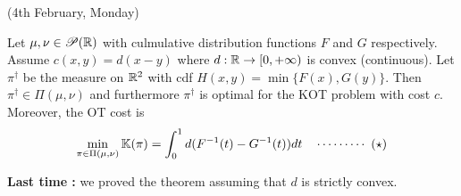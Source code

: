 \documentclass[12pt,a4paper]{article}
\begin{document}
\newday

(4th February, Monday)
\s

\thm Let $\mu, \nu \in \mathscr{P}(\mathbb{R})$ with culmulative distribution functions $F$ and $G$ respectively. Assume $c(x,y) = d(x-y)$ where $d: \mathbb{R} \rightarrow [0, +\infty)$ is convex (continuous). Let $\pi^{\dagger}$ be the measure on $\mathbb{R}^2$ with cdf $H(x,y) = \min \{ F(x), G(y) \}$. Then $\pi^{\dagger} \in \Pi(\mu, \nu)$ and furthermore $\pi^{\dagger}$ is optimal for the KOT problem with cost $c$. Moreover, the OT cost is
\begin{align*}
\min_{\pi \in \Pi(\mu, \nu)} \mathbb{K}(\pi) = \int_0^1 d(F^{-1}(t) - G^{-1}(t)) dt \quad \cdots\cdots\cdots\,\,(\star)
\end{align*} 

\textbf{Last time :} we proved the theorem assuming that $d$ is strictly convex.
\end{document}
